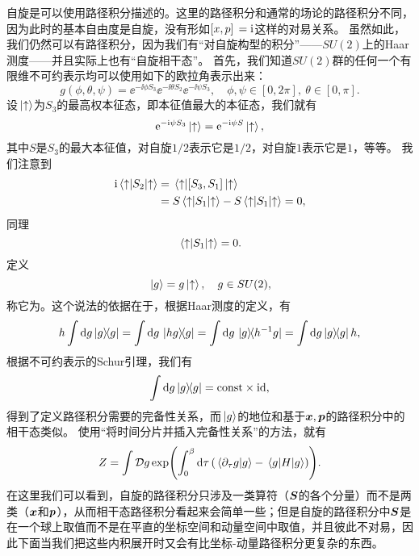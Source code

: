 自旋是可以使用路径积分描述的。这里的路径积分和通常的场论的路径积分不同，因为此时的基本自由度是自旋，没有形如$\comm*{x}{p} = \ii$这样的对易关系。
虽然如此，我们仍然可以有路径积分，因为我们有“对自旋构型的积分”——$SU(2)$上的Haar测度——并且实际上也有“自旋相干态”。
首先，我们知道$SU(2)$群的任何一个有限维不可约表示均可以使用如下的欧拉角表示出来：
\begin{equation}
    g(\phi, \theta, \psi) = \ee^{- \ii \phi S_3} \ee^{- \ii \theta S_2} \ee^{- \ii \psi S_3}, \quad \phi, \psi \in [0, 2\pi], \ \theta \in [0, \pi].
\end{equation}
设$\ket*{\uparrow}$为$S_3$的最高权本征态，即本征值最大的本征态，我们就有
\begin{equation}
    \mathrm{e}^{- \mathrm{i} \psi S_3} \ket*{\uparrow} = \mathrm{e}^{- \mathrm{i} \psi S} \ket*{\uparrow},
\end{equation}
其中$S$是$S_3$的最大本征值，对自旋$1/2$表示它是$1/2$，对自旋$1$表示它是$1$，等等。
我们注意到
\[
    \begin{aligned}
        \ii \mel*{\uparrow}{S_2}{\uparrow} &= \mel*{\uparrow}{\comm*{S_3}{S_1}}{\uparrow} \\
        &= S \mel*{\uparrow}{S_1}{\uparrow} - S \mel*{\uparrow}{S_1}{\uparrow} = 0,
    \end{aligned}
\]
同理
\[
    \mel*{\uparrow}{S_1}{\uparrow} = 0.
\]
定义
\begin{equation}
    \ket*{g} = g \ket*{\uparrow}, \quad g \in SU(2),
\end{equation}
称它为。这个说法的依据在于，根据Haar测度的定义，有
\[
    h \int \dd{g} \dyad{g} = \int \dd{g} \dyad*{hg}{g} = \int \dd{g} \dyad*{g}{h^{-1} g} = \int \dd{g} \dyad{g} h, 
\]
根据不可约表示的Schur引理，我们有
\begin{equation}
    \int \dd{g} \dyad{g} = \const \times \mathrm{id}, 
\end{equation}
得到了定义路径积分需要的完备性关系，而$\ket*{g}$的地位和基于$\vb*{x}, \vb*{p}$的路径积分中的相干态类似。
使用“将时间分片并插入完备性关系”的方法，就有
\begin{equation}
    Z = \int \mathcal{D} g \exp(\int_0^\beta \dd{\tau} (\braket*{\partial_\tau g}{g} - \mel*{g}{H}{g})).
    \label{eq:spin-partition-original}
\end{equation}
在这里我们可以看到，自旋的路径积分只涉及一类算符（$\vb*{S}$的各个分量）而不是两类（$\vb*{x}$和$\vb*{p}$），从而相干态路径积分看起来会简单一些；但是自旋的路径积分中$\vb*{S}$是在一个球上取值而不是在平直的坐标空间和动量空间中取值，并且彼此不对易，因此下面当我们把这些内积展开时又会有比坐标-动量路径积分更复杂的东西。

